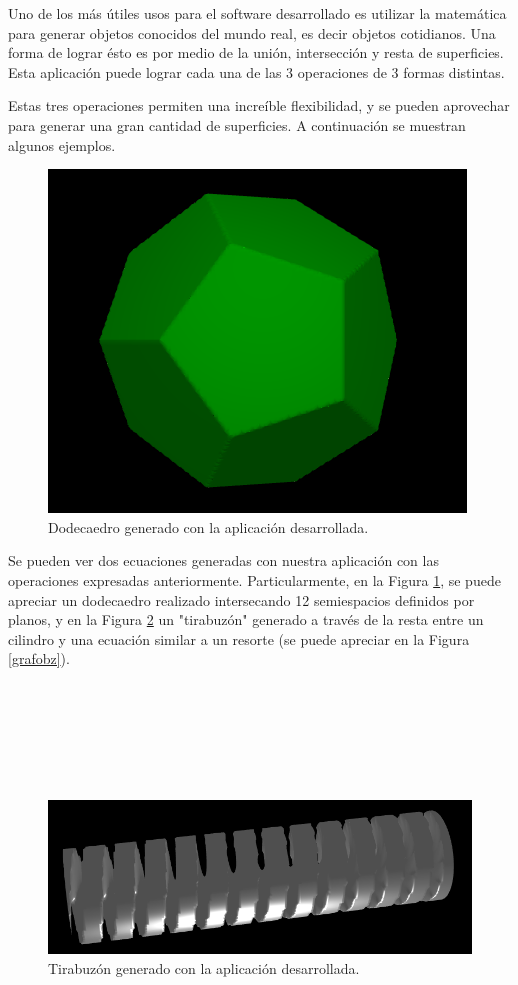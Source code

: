 \documentclass[12pt]{article}
\begin{document}
Uno de los más útiles usos para el software desarrollado es utilizar la matemática para generar objetos conocidos del mundo real, es decir objetos cotidianos. Una forma de lograr ésto es por medio de la unión, intersección y resta de superficies. Esta aplicación puede lograr cada una de las 3 operaciones de 3 formas distintas.

Estas tres operaciones permiten una increíble flexibilidad, y se pueden aprovechar para generar una gran cantidad de superficies. A continuación se muestran algunos ejemplos.\\
\begin{figure}
\includegraphics[width=0.9\linewidth]{dodecaedro.png} 
\caption{Dodecaedro generado con la aplicación desarrollada.}
\label{dode}
\end{figure}

Se pueden ver dos ecuaciones generadas con nuestra aplicación con las operaciones expresadas anteriormente. Particularmente, en la Figura \ref{dode}, se puede apreciar un dodecaedro realizado intersecando 12 semiespacios definidos por planos, y en la Figura \ref{tornillo} un "tirabuzón" generado a través de la resta entre un cilindro  y una ecuación similar a un resorte (se puede apreciar en la Figura \ref{grafobz}).
\\
\\
\\
\\
\\
\\
\\

\begin{figure}[h]
\includegraphics[width=0.7\linewidth,center]{tornillo.png}
\caption{Tirabuzón generado con la aplicación desarrollada.}
\label{tornillo}
\end{figure}
\end{document}
